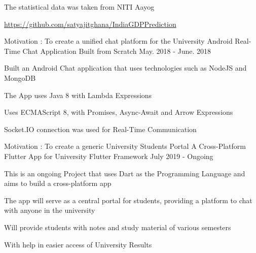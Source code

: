 \begin{cventries}
{\begin{cvitems}
               \item {The statistical data was taken from NITI Aayog}
               \item {\url{https://github.com/satyajitghana/IndiaGDPPrediction}}
            \end{cvitems}
        }
    \cventry
        {Motivation : To create a unified chat platform for the University}
        {Android Real-Time Chat Application}
        {Built from Scratch}
        {May. 2018 - June. 2018}
        {
            \begin{cvitems}
                \item {Built an Android Chat application that uses technologies such as NodeJS and MongoDB}
                \item {The App uses Java 8 with Lambda Expressions}
                \item {Uses ECMAScript 8, with Promises, Async-Await and Arrow Expressions}
                \item {Socket.IO connection was used for Real-Time Communication}
            \end{cvitems}
        }
    \cventry
        {Motivation : To create a generic University Students Portal}
        {A Cross-Platform Flutter App for University}
        {Flutter Framework}
        {July 2019 - Ongoing}
            {
            \begin{cvitems}
                \item {This is an ongoing Project that uses Dart as the Programming Language and aims to build a cross-platform app}
                \item {The app will serve as a central portal for students, providing a platform to chat with anyone in the university}
                \item {Will provide students with notes and study material of various semesters}
                \item {With help in easier access of University Results}
        \end{cvitems}
        }
\end{cventries}